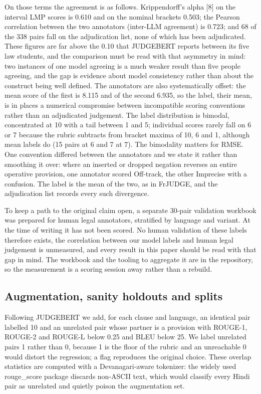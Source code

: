 \documentclass[conference]{IEEEtran}
\begin{document}
On those terms the agreement is as follows. Krippendorff's alpha [8] on the interval LMP scores is 0.610 and on the nominal brackets 0.503; the Pearson correlation between the two annotators (inter-LLM agreement) is 0.723; and 68 of the 338 pairs fall on the adjudication list, none of which has been adjudicated. These figures are far above the 0.10 that JUDGEBERT reports between its five law students, and the comparison must be read with that asymmetry in mind: two instances of one model agreeing is a much weaker result than five people agreeing, and the gap is evidence about model consistency rather than about the construct being well defined. The annotators are also systematically offset: the mean score of the first is 8.115 and of the second 6.935, so the label, their mean, is in places a numerical compromise between incompatible scoring conventions rather than an adjudicated judgement. The label distribution is bimodal, concentrated at 10 with a tail between 1 and 5; individual scores rarely fall on 6 or 7 because the rubric subtracts from bracket maxima of 10, 6 and 1, although mean labels do (15 pairs at 6 and 7 at 7). The bimodality matters for RMSE. One convention differed between the annotators and we state it rather than smoothing it over: where an inserted or dropped negation reverses an entire operative provision, one annotator scored Off-track, the other Imprecise with a confusion. The label is the mean of the two, as in FrJUDGE, and the adjudication list records every such divergence.

To keep a path to the original claim open, a separate 30-pair validation workbook was prepared for human legal annotators, stratified by language and variant. At the time of writing it has not been scored. No human validation of these labels therefore exists, the correlation between our model labels and human legal judgement is unmeasured, and every result in this paper should be read with that gap in mind. The workbook and the tooling to aggregate it are in the repository, so the measurement is a scoring session away rather than a rebuild.

\subsection{Augmentation, sanity holdouts and splits}

Following JUDGEBERT we add, for each clause and language, an identical pair labelled 10 and an unrelated pair whose partner is a provision with ROUGE-1, ROUGE-2 and ROUGE-L below 0.25 and BLEU below 25. We label unrelated pairs 1 rather than 0, because 1 is the floor of the rubric and an unreachable 0 would distort the regression; a flag reproduces the original choice. These overlap statistics are computed with a Devanagari-aware tokenizer: the widely used rouge\_score package discards non-ASCII text, which would classify every Hindi pair as unrelated and quietly poison the augmentation set.
\end{document}
